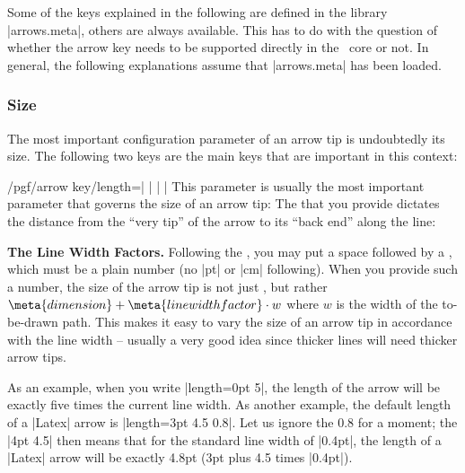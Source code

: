 Some of the keys explained in the following are defined in the library
|arrows.meta|, others are always available. This has to do with the
question of whether the arrow key needs to be supported directly in the
\pgfname\ core or not. In general, the following explanations assume
that |arrows.meta| has been loaded.


\subsubsection{Size}

The most important configuration parameter of an arrow tip is
undoubtedly its size. The following two keys are the main keys that
are important in this context:

\begin{key}{/pgf/arrow key/length=| |%
    | |}
  \label{length-arrow-key}%
  This parameter is usually the most important parameter that governs
  the size of an arrow tip: The  that you provide
  dictates the distance from the ``very tip'' of the arrow to its
  ``back end'' along the line:
\begin{codeexample}[]
\end{codeexample}
\begin{codeexample}[]
\end{codeexample}
\begin{codeexample}[]
\end{codeexample}

  \medskip
  \noindent \textbf{The Line Width Factors.}
  Following the , you may put a space followed by a
  , which must be a plain number (no |pt| or
  |cm| following). When you provide such a number, the size of the
  arrow tip is not just , but rather $\meta{dimension}
  + \meta{line width factor}\cdot w$ where
  $w$ is the width of the to-be-drawn path. This
  makes it easy to vary the size of an arrow tip in accordance with
  the line width -- usually a very good idea since thicker lines will
  need thicker arrow tips. 

  As an example, when you write |length=0pt 5|, the length of the
  arrow will be exactly five times the current line width. As another
  example, the default length of a |Latex| arrow is
  |length=3pt 4.5 0.8|. Let us ignore the 0.8 for a moment; the
  |4pt 4.5| then means that for the standard line width of
  |0.4pt|, the length of a |Latex| arrow will be exactly 4.8pt (3pt
  plus 4.5 times |0.4pt|). 


\end{key}
